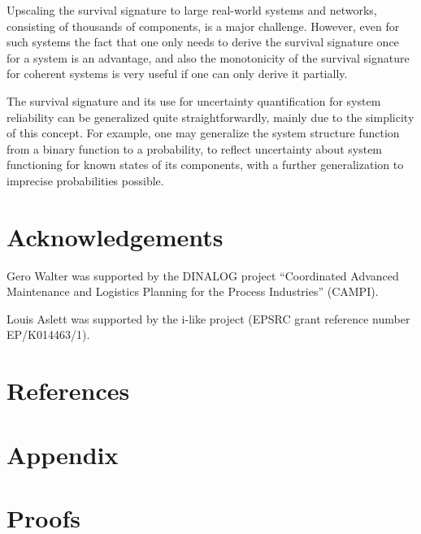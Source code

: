 \documentclass[12pt, a4paper]{elsarticle}
\begin{document}
Upscaling the survival signature to large real-world systems and networks, consisting of thousands of components, is a major challenge.
However, even for such systems the fact that one only needs to derive the survival signature once for a system is an advantage,
and also the monotonicity of the survival signature for coherent systems is very useful if one can only derive it partially.  

The survival signature and its use for uncertainty quantification for system
reliability can be generalized quite straightforwardly, mainly due to the simplicity of this concept.
For example, one may generalize the system structure function from a binary function to a probability, %
to reflect uncertainty about system functioning for known states of its components, with a further
generalization to imprecise probabilities possible.

\section*{Acknowledgements}

Gero Walter was supported by the DINALOG project
``Coordinated Advanced Maintenance and Logistics Planning for the Process Industries'' (CAMPI).

Louis Aslett was supported by the i-like project (EPSRC grant reference number EP/K014463/1).


\section*{References}





\section*{Appendix}
\appendix
\renewcommand*{\thesection}{\Alph{section}}

\section{Proofs}
\label{ap:proofs}
\end{document}
